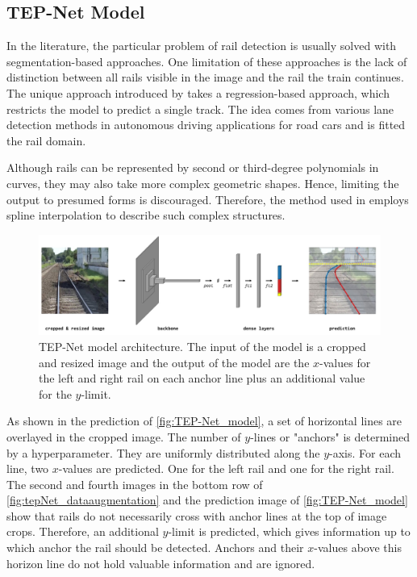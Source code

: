 \subsection{TEP-Net Model}

In the literature, the particular problem of rail detection is usually solved with segmentation-based approaches.
One limitation of these approaches is the lack of distinction between all rails visible in the image and the rail the train continues.
The unique approach introduced by \cite{tepNet2024} takes a regression-based approach, which restricts the model to predict a single track.
The idea comes from various lane detection methods in autonomous driving applications for road cars and is fitted the rail domain.

Although rails can be represented by second or third-degree polynomials in curves, they may also take more complex geometric shapes.
Hence, limiting the output to presumed forms is discouraged.
Therefore, the method used in \cite{tepNet2024} employs spline interpolation to describe such complex structures.

\begin{figure}[H]
    \centering
    \includegraphics[width=\linewidth]{PICs/Baselinepaper/TEP-Net_model.jpg}
    \caption{\ac{TEP}-Net model architecture\cite{tepNet2024}. The input of the model is a cropped and resized image and the output of the model are the $x$-values for the left and right rail on each anchor line plus an additional value for the $y$-limit.}
    \label{fig:TEP-Net_model}
\end{figure}

As shown in the prediction of \autoref{fig:TEP-Net_model}, a set of horizontal lines are overlayed in the cropped image.
The number of $y$-lines or "anchors" is determined by a hyperparameter.
They are uniformly distributed along the $y$-axis. For each line, two $x$-values are predicted.
One for the left rail and one for the right rail.
The second and fourth images in the bottom row of \autoref{fig:tepNet_dataaugmentation} and the prediction image of \autoref{fig:TEP-Net_model} show that rails do not necessarily cross with anchor lines at the top of image crops.
Therefore, an additional $y$-limit is predicted, which gives information up to which anchor the rail should be detected.
Anchors and their $x$-values above this horizon line do not hold valuable information and are ignored.

